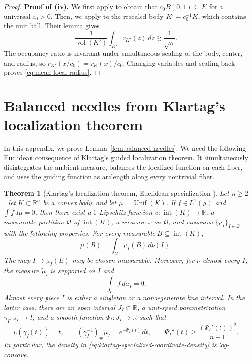 \documentclass[11pt]{article}
\newtheorem{theorem}{Theorem}[section]
\theoremstyle{definition}
\theoremstyle{remark}
\newcommand{\R}{\mathbb R}
\newcommand{\vol}{\operatorname{vol}}
\newcommand{\Unif}{\operatorname{Unif}}
\begin{document}
\begin{proof}
\textbf{Proof of \textup{(iv)}.} We first apply \cite[Theorem~4.1]{KLS95} to obtain that $c_0B(0,1)\subseteq K$ for a universal \(c_0>0\).  Then, we apply
\cite[Lemma~3.4]{LV} to the rescaled body
\(K'=c_0^{-1}K\), which contains the unit ball.  Their lemma gives
\[
 \frac1{\vol(K')}\int_{K'} r_{K'}(z)\,dz
 \gtrsim \frac1{\sqrt n}.
\]
The occupancy ratio is invariant under simultaneous scaling of the body,
center, and radius, so
\(r_{K'}(x/c_0)=r_K(x)/c_0\).  Changing variables and scaling back proves
\eqref{eq:mean-local-radius}.
\end{proof}


\section{Balanced needles from Klartag's localization theorem}
\label{app:klartag-balanced-needles}

In this appendix, we prove Lemma~\ref{lem:balanced-needles}.  We need the following Euclidean consequence of Klartag's guided localization theorem. It simultaneously disintegrates the ambient measure, balances the localized function on each fiber, and uses the guiding function as arclength along every nontrivial fiber.

\begin{theorem}[Klartag's localization theorem, Euclidean specialization
\cite{KlartagNeedles}]
\label{thm:klartag-euclidean-localization}
Let $n\ge2$, let $K\subset\R^n$ be a convex body, and let
$\mu=\Unif(K)$.  If $f\in L^1(\mu)$ and $\int f\,d\mu=0$, then there exist
a $1$-Lipschitz function $u:{\operatorname{int}(K)}\to\R$, a measurable partition
$\mathcal Q$ of ${\operatorname{int}(K)}$, a measure $\nu$ on $\mathcal Q$, and measures
$\{\widetilde\mu_I\}_{I\in\mathcal Q}$ with the following properties.
For every measurable $B\subseteq{\operatorname{int}(K)}$,
\begin{equation}\label{eq:klartag-specialized-disintegration}
 \mu(B)=\int_{\mathcal Q}\widetilde\mu_I(B)\,d\nu(I).
\end{equation}
The map $I\mapsto\widetilde\mu_I(B)$ may be chosen measurable.  Moreover, for
$\nu$-almost every $I$, the measure $\widetilde\mu_I$ is supported on $I$
and
\begin{equation}\label{eq:klartag-specialized-balance}
 \int_I f\,d\widetilde\mu_I=0.
\end{equation}
Almost every piece $I$ is either a singleton or a nondegenerate line
interval.  In the latter case, there are an open interval
$J_I\subset\R$, a unit-speed parametrization $\gamma_I:J_I\to I$, and a
smooth function $\Psi_I:J_I\to\R$ such that
\begin{equation}\label{eq:klartag-specialized-coordinate-density}
 u(\gamma_I(t))=t,
 \qquad
 (\gamma_I^{-1})_\#\widetilde\mu_I
   =e^{-\Psi_I(t)}\,dt,
 \qquad
 \Psi_I''(t)\ge \frac{(\Psi_I'(t))^2}{n-1}.
\end{equation}
In particular, the density in \eqref{eq:klartag-specialized-coordinate-density}
is log-concave.
\end{theorem}
\end{document}
